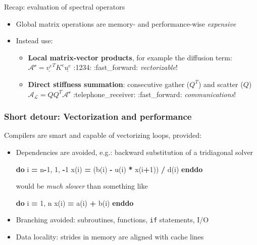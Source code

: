 \documentclass[
]{scrartcl}
\newenvironment{Shaded}{}{}
\newcommand{\DecValTok}[1]{\textcolor[rgb]{0.25,0.63,0.44}{#1}}
\newcommand{\KeywordTok}[1]{\textcolor[rgb]{0.00,0.44,0.13}{\textbf{#1}}}
\newcommand{\NormalTok}[1]{#1}
\providecommand{\tightlist}{%
  \setlength{\itemsep}{0pt}\setlength{\parskip}{0pt}}
\begin{document}
Recap: evaluation of spectral operators

\begin{itemize}
\tightlist
\item
  Global matrix operations are memory- and performance-wise
  \emph{expensive}
\item
  Instead use:

  \begin{itemize}
  \tightlist
  \item
    \textbf{Local matrix-vector products}, for example the diffusion
    term: \(\mathcal{A^e}=\underline{v^e}^{T}K^e\underline{u^e}\) :1234:
    :fast\_forward: \emph{vectorizable}!
  \item
    \textbf{Direct stiffness summation}: consecutive gather (\(Q^T\))
    and scatter (\(Q\)) \(\mathcal{A_L} = Q Q^T \mathcal{A^e}\)
    :telephone\_receiver: :fast\_forward: \emph{communications}!
  \end{itemize}
\end{itemize}

\hypertarget{short-detour-vectorization-and-performance}{%
\subsubsection{Short detour: Vectorization and
performance}\label{short-detour-vectorization-and-performance}}

Compilers are smart and capable of vectorizing loops, provided:

\begin{itemize}
\item
  Dependencies are avoided, e.g.: backward substitution of a tridiagonal
  solver

\begin{Shaded}
\begin{Highlighting}[]
\KeywordTok{do}\NormalTok{ i }\KeywordTok{=}\NormalTok{ n}\KeywordTok{{-}}\DecValTok{1}\NormalTok{, }\DecValTok{1}\NormalTok{, }\KeywordTok{{-}}\DecValTok{1}
\NormalTok{   x(i) }\KeywordTok{=}\NormalTok{ (b(i) }\KeywordTok{{-}}\NormalTok{ u(i) }\KeywordTok{*}\NormalTok{ x(i}\KeywordTok{+}\DecValTok{1}\NormalTok{)) }\KeywordTok{/}\NormalTok{ d(i)}
\KeywordTok{enddo}
\end{Highlighting}
\end{Shaded}

  would be \emph{much slower} than something like

\begin{Shaded}
\begin{Highlighting}[]
\KeywordTok{do}\NormalTok{ i }\KeywordTok{=} \DecValTok{1}\NormalTok{, n}
\NormalTok{   x(i) }\KeywordTok{=}\NormalTok{ a(i) }\KeywordTok{+}\NormalTok{ b(i)}
\KeywordTok{enddo}
\end{Highlighting}
\end{Shaded}
\item
  Branching avoided: subroutines, functions, \texttt{if} statements, I/O
\item
  Data locality: strides in memory are aligned with cache lines
\end{itemize}
\end{document}
